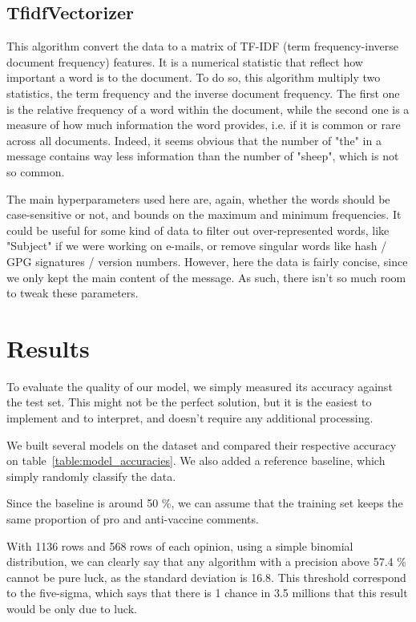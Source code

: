 \documentclass[11pt]{article}
\begin{document}
\subsection{TfidfVectorizer}

This algorithm convert the data to a matrix of TF-IDF (term frequency-inverse document frequency) features.
It is a numerical statistic that reflect how important a word is to the document.
To do so, this algorithm multiply two statistics, the term frequency and the inverse document frequency. 
The first one is the relative frequency of a word within the document,
while the second one is a measure of how much information the word provides, i.e. if it is common or rare across all documents.
Indeed, it seems obvious that the number of "the" in a message contains way less
information than the number of "sheep", which is not so common.

The main hyperparameters used here are, again, whether the words should be case-sensitive or not,
and bounds on the maximum and minimum frequencies.
It could be useful for some kind of data to filter out over-represented words, like "Subject" if we were working on e-mails,
or remove singular words like hash / GPG signatures / version numbers.
However, here the data is fairly concise, since we only kept the main content of the message.
As such, there isn't so much room to tweak these parameters.

\section{Results}

To evaluate the quality of our model, we simply measured its accuracy against the test set.
This might not be the perfect solution, but it is the easiest to implement and to interpret,
and doesn't require any additional processing.

We built several models on the dataset and compared their respective accuracy on table~\ref{table:model_accuracies}.
We also added a reference baseline, which simply randomly classify the data.

Since the baseline is around 50 \%, we can assume that the training set keeps the same proportion of pro and anti-vaccine comments.

With 1136 rows and 568 rows of each opinion, using a simple binomial distribution,
we can clearly say that any algorithm with a precision above 57.4 \% cannot be pure luck, as the standard deviation is 16.8.
This threshold correspond to the five-sigma, which says that there is
1 chance in 3.5 millions that this result would be only due to luck.
\end{document}
